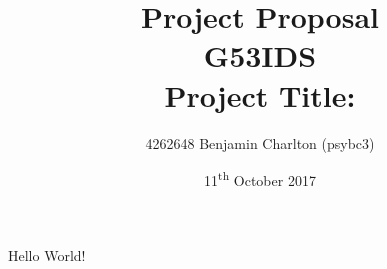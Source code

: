 \documentclass{article}
\title{
    Project Proposal
    \\ \normalsize{G53IDS}
    \\ \normalsize{Project Title: }}
\author{4262648 Benjamin Charlton (psybc3)}
\date{11\textsuperscript{th} October 2017}
\begin{document}
\maketitle
Hello World!
\end{document}
